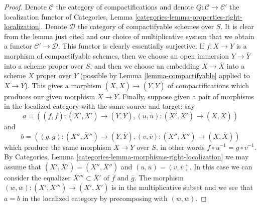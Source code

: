 \documentclass[10pt,a4paper]{amsart}
\theoremstyle{plain}
\theoremstyle{definition}
\theoremstyle{remark}
\numberwithin{equation}{subsection}
\begin{document}
\begin{proof}
Denote $\mathcal{C}$ the category of compactifications and
denote $Q : \mathcal{C} \to \mathcal{C}'$ the localization
functor of Categories, Lemma
\ref{categories-lemma-properties-right-localization}.
Denote $\mathcal{D}$ the category of compactifyable schemes
over $S$. It is clear from the lemma just cited and our
choice of multiplicative system that we
obtain a functor $\mathcal{C}' \to \mathcal{D}$.
This functor is clearly essentially surjective.
If $f : X \to Y$ is a morphism of compactifyable
schemes, then we choose an open immersion $Y \to \overline{Y}$
into a scheme proper over $S$, and then we choose an embedding
$X \to \overline{X}$ into a scheme $\overline{X}$ proper over
$\overline{Y}$ (possible by Lemma \ref{lemma-compactifyable}
applied to $X \to \overline{Y}$). This gives a morphism
$(X, \overline{X}) \to (Y, \overline{Y})$ of compactifications
which produces our given morphism $X \to Y$.
Finally, suppose given a pair of morphisms in the
localized category with the same source and target: say
$$
a = ((f, \overline{f}) : (X', \overline{X}') \to (Y, \overline{Y}),
(u, \overline{u}) : (X', \overline{X}') \to (X, \overline{X}))
$$
and
$$
b = ((g, \overline{g}) : (X'', \overline{X}'') \to (Y, \overline{Y}),
(v, \overline{v}) : (X'', \overline{X}'') \to (X, \overline{X}))
$$
which produce the same morphism $X \to Y$ over $S$, in other words
$f \circ u^{-1} = g \circ v^{-1}$. By
Categories, Lemma \ref{categories-lemma-morphisms-right-localization}
we may assume that $(X', \overline{X}') = (X'', \overline{X}'')$
and $(u, \overline{u}) = (v, \overline{v})$. In this case we
can consider the equalizer $\overline{X}''' \subset \overline{X}'$
of $\overline{f}$ and $\overline{g}$. The morphism
$(w, \overline{w}) : (X', \overline{X}''') \to (X', \overline{X}')$ is in
the multiplicative subset and we see that $a = b$ in the localized
category by precomposing with $(w, \overline{w})$.
\end{proof}
\end{document}
